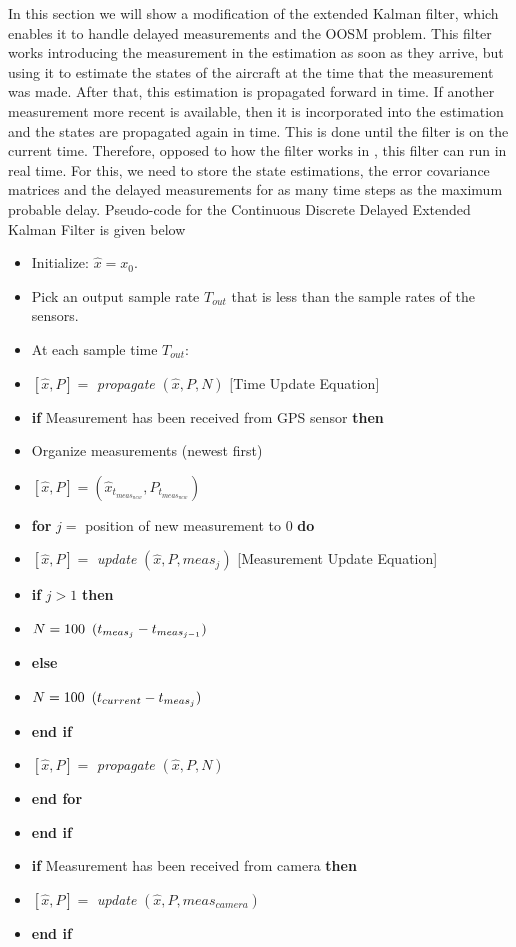 In this section we will show a modification of the extended Kalman filter, which enables it to handle delayed measurements and the OOSM problem. This filter works introducing the measurement in the estimation as soon as they arrive, but using it to estimate the states of the aircraft at the time that the measurement was made. After that, this estimation is propagated forward in time. If another measurement more recent is available, then it is incorporated into the estimation and the states are propagated again in time. This is done until the filter is on the current time. Therefore, opposed to how the filter works in \cite{Nettleton2001}, this filter can run in real time. For this, we need to store the state estimations, the error covariance matrices and the delayed measurements for as many time steps as the maximum probable delay. \linebreak \linebreak
Pseudo-code for the Continuous Discrete Delayed Extended Kalman Filter is given below
\renewcommand{\labelitemi}{$\cdot$}
\begin{itemize}[nosep]
\item Initialize: $ \hat{x}=x_0 $.
\item Pick an output sample rate $T_{out}$ that is less than the sample rates of the sensors.
\item At each sample time $T_{out}$:
\item $ [\hat{x},P]=$ \textit{propagate} $(\hat{x},P,N)$ [Time Update Equation]
\item \textbf{if} Measurement has been received from GPS sensor \textbf{then} 
\item \quad Organize measurements (newest first)
\item \quad $[\hat{x},P]=(\hat{x}_{t_{{meas}_{new}}},P_{t_{{meas}_{new}}})$
\item \quad \textbf{for} $j=$ position of new measurement to $0$ \textbf{do}
\item \qquad $[\hat{x},P]=$ \textit{update} $(\hat{x},P,meas_j)$ [Measurement Update Equation]
\item \qquad \textbf{if} $j>1$ \textbf{then}
\item \qquad \quad $N=100\enskip(t_{{meas}_j}-t_{{meas}_{j-1}})$
\item \qquad \textbf{else}
\item \qquad \quad $N=100\enskip(t_{current}-t_{{meas}_j})$
\item \qquad \textbf{end if}
\item \qquad $[\hat{x},P]=$ \textit{propagate} $(\hat{x},P,N)$
\item \quad \textbf{end for}
\item \textbf{end if}

\item \textbf{if} Measurement has been received from camera \textbf{then} 
\item \quad $[\hat{x},P]=$ \textit{update} $(\hat{x},P,meas_{camera})$
\item \textbf{end if}
\end{itemize}
